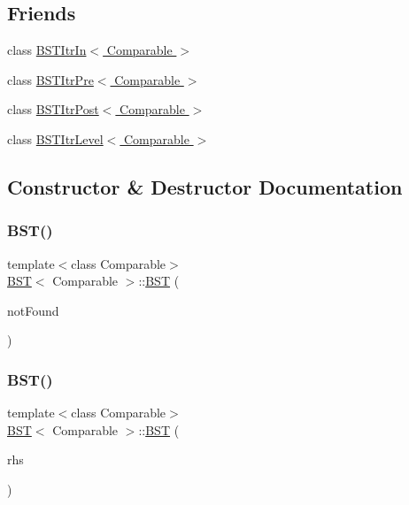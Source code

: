 \subsection*{Friends}
\begin{DoxyCompactItemize}
\item 
class \hyperlink{class_b_s_t_aab3993acac2ab24a0b59edb0c3acc775}{B\+S\+T\+Itr\+In$<$ Comparable $>$}
\item 
class \hyperlink{class_b_s_t_a45a55df6f11541416d4ea7684c575c1a}{B\+S\+T\+Itr\+Pre$<$ Comparable $>$}
\item 
class \hyperlink{class_b_s_t_a5dc153694be266f6e772659486219da7}{B\+S\+T\+Itr\+Post$<$ Comparable $>$}
\item 
class \hyperlink{class_b_s_t_a26ff00bc0d87069aed877f10fd3c80a8}{B\+S\+T\+Itr\+Level$<$ Comparable $>$}
\end{DoxyCompactItemize}


\subsection{Constructor \& Destructor Documentation}
\mbox{\label{class_b_s_t_a3185a79cf472271f122a97d0f59022d1}} 
\subsubsection{\texorpdfstring{B\+S\+T()}{BST()}\hspace{0.1cm}{\footnotesize\ttfamily [1/2]}}
{\footnotesize\ttfamily template$<$class Comparable$>$ \\
\hyperlink{class_b_s_t}{B\+ST}$<$ Comparable $>$\+::\hyperlink{class_b_s_t}{B\+ST} (\begin{DoxyParamCaption}\item[{const Comparable \&}]{not\+Found }\end{DoxyParamCaption})\hspace{0.3cm}{\ttfamily [explicit]}}

\mbox{\label{class_b_s_t_a163232cc6ffcbd1a51707efcc3fa36ca}} 
\subsubsection{\texorpdfstring{B\+S\+T()}{BST()}\hspace{0.1cm}{\footnotesize\ttfamily [2/2]}}
{\footnotesize\ttfamily template$<$class Comparable$>$ \\
\hyperlink{class_b_s_t}{B\+ST}$<$ Comparable $>$\+::\hyperlink{class_b_s_t}{B\+ST} (\begin{DoxyParamCaption}\item[{const \hyperlink{class_b_s_t}{B\+ST}$<$ Comparable $>$ \&}]{rhs }\end{DoxyParamCaption})}


